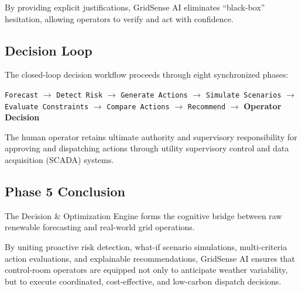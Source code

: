 By providing explicit justifications, GridSense AI eliminates ``black-box'' hesitation, allowing operators to verify and act with confidence.

\subsection{Decision Loop}
\label{subsec:decision_loop}

The closed-loop decision workflow proceeds through eight synchronized phases:
\begin{center}
    \texttt{Forecast} $\longrightarrow$ \texttt{Detect Risk} $\longrightarrow$ \texttt{Generate Actions} $\longrightarrow$ \texttt{Simulate Scenarios} $\longrightarrow$ \texttt{Evaluate Constraints} $\longrightarrow$ \texttt{Compare Actions} $\longrightarrow$ \texttt{Recommend} $\longrightarrow$ \textbf{\color{accentAmber}Operator Decision}
\end{center}

The human operator retains ultimate authority and supervisory responsibility for approving and dispatching actions through utility supervisory control and data acquisition (SCADA) systems.

\subsection{Phase 5 Conclusion}
\label{subsec:phase5_conclusion}

The Decision \& Optimization Engine forms the cognitive bridge between raw renewable forecasting and real-world grid operations.

By uniting proactive risk detection, what-if scenario simulations, multi-criteria action evaluations, and explainable recommendations, GridSense AI ensures that control-room operators are equipped not only to anticipate weather variability, but to execute coordinated, cost-effective, and low-carbon dispatch decisions.
